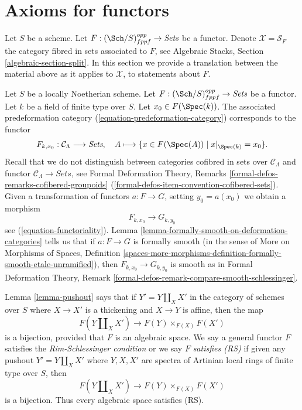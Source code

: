 \section{Axioms for functors}
\label{section-axioms-functors}

\noindent
Let $S$ be a scheme. Let $F : (\Sch/S)_{fppf}^{opp} \to \textit{Sets}$ be a
functor. Denote $\mathcal{X} = \mathcal{S}_F$ the category fibred in sets
associated to $F$, see Algebraic Stacks, Section \ref{algebraic-section-split}.
In this section we provide a translation between the material above
as it applies to $\mathcal{X}$, to statements about $F$.

\medskip\noindent
Let $S$ be a locally Noetherian scheme. Let
$F : (\Sch/S)_{fppf}^{opp} \to \textit{Sets}$ be a functor. Let $k$ be
a field of finite type over $S$. Let $x_0 \in F(\Spec(k))$.
The associated predeformation category (\ref{equation-predeformation-category})
corresponds to the functor
$$
F_{k, x_0} : \mathcal{C}_\Lambda \longrightarrow \textit{Sets},
\quad
A \longmapsto \{x \in F(\Spec(A)) \mid x|_{\Spec(k)} = x_0 \}.
$$
Recall that we do not distinguish between
categories cofibred in sets over $\mathcal{C}_\Lambda$
and functor $\mathcal{C}_\Lambda \to \textit{Sets}$,
see Formal Deformation Theory, Remarks
\ref{formal-defos-remarks-cofibered-groupoids}
(\ref{formal-defos-item-convention-cofibered-sets}).
Given a transformation of functors $a : F \to G$, setting
$y_0 = a(x_0)$ we obtain a morphism
$$
F_{k, x_0} \longrightarrow G_{k, y_0}
$$
see (\ref{equation-functoriality}).
Lemma \ref{lemma-formally-smooth-on-deformation-categories} tells us that if
$a : F \to G$ is formally smooth (in the sense of
More on Morphisms of Spaces, Definition
\ref{spaces-more-morphisms-definition-formally-smooth-etale-unramified}), then
$F_{k, x_0} \longrightarrow G_{k, y_0}$ is smooth as
in Formal Deformation Theory, Remark
\ref{formal-defos-remark-compare-smooth-schlessinger}.

\medskip\noindent
Lemma \ref{lemma-pushout} says that if $Y' = Y \amalg_X X'$ in the
category of schemes over $S$ where $X \to X'$ is a thickening and
$X \to Y$ is affine, then the map
$$
F(Y \amalg_X X') \to F(Y) \times_{F(X)} F(X')
$$
is a bijection, provided that $F$ is an algebraic space.
We say a general functor $F$ satisfies the {\it Rim-Schlessinger condition}
or we say $F$ {\it satisfies (RS)} if given any
pushout $Y' = Y \amalg_X X'$ where $Y, X, X'$ are spectra of Artinian
local rings of finite type over $S$, then
$$
F(Y \amalg_X X') \to F(Y) \times_{F(X)} F(X')
$$
is a bijection. Thus every algebraic space satisfies (RS).

